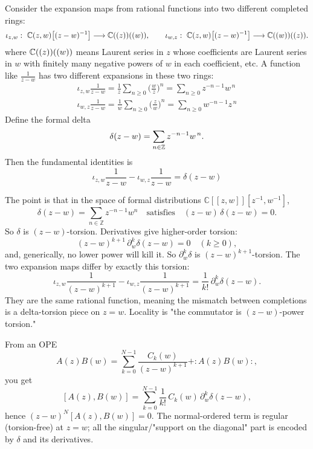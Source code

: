 \documentclass[12pt]{article}
\begin{document}
\begin{remark}
     Consider the expansion maps from rational functions into two different completed rings:
\[
\iota_{z,w}:\ \C(z,w)\!\left[(z-w)^{-1}\right]\longrightarrow \C((z))((w)),
\qquad
\iota_{w,z}:\ \C(z,w)\!\left[(z-w)^{-1}\right]\longrightarrow \C((w))((z)).
\] where \( \mathbb{C}((z))((w)) \) means Laurent series in $z$ whose coefficients are Laurent series in $w$ with finitely many negative powers of $w$ in each coefficient, etc. A function like \( \frac{1}{z-w} \) has two different expansions in these two rings: \begin{align*}
\iota_{z,w}\frac{1}{z-w}
= \frac{1}{z}\sum_{n\ge0}\Big(\frac{w}{z}\Big)^n
= \sum_{n\ge0} z^{-n-1} w^{\,n} \\
\iota_{w,z}\frac{1}{z-w}
= \frac{1}{w}\sum_{n\ge0}\Big(\frac{z}{w}\Big)^n
= \sum_{n\ge0} w^{-n-1} z^{\,n}
\end{align*}
Define the formal delta
\[
\delta(z-w)=\sum_{n\in\mathbb{Z}} z^{-n-1}w^{\,n}.
\]
Then the fundamental identities is
\[
\iota_{z,w}\frac{1}{z-w}-\iota_{w,z}\frac{1}{z-w}= \delta(z-w)
\]
\end{remark}
The point is that in the space of formal distributions $\mathbb{C}[[z,w]][z^{-1},w^{-1}]$,
\[
\delta(z-w)=\sum_{n\in\mathbb{Z}} z^{-n-1}w^n
\quad\text{satisfies}\quad
(z-w)\,\delta(z-w)=0.
\]
So $\delta$ is $(z-w)$-torsion. Derivatives give higher-order torsion:
\[
(z-w)^{k+1}\,\partial_w^k\delta(z-w)=0\quad(k\ge0),
\]
and, generically, no lower power will kill it. So $\partial_w^k\delta$ is $(z-w)^{k+1}$-torsion. The two expansion maps differ by exactly this torsion:
\[
\iota_{z,w}\frac{1}{(z-w)^{k+1}}-\iota_{w,z}\frac{1}{(z-w)^{k+1}}
=\frac{1}{k!}\,\partial_w^k\delta(z-w).
\]
They are the same rational function, meaning the mismatch between completions is a delta-torsion piece on $z=w$. Locality is "the commutator is $(z-w)$-power torsion."

From an OPE
\[
A(z)B(w)=\sum_{k=0}^{N-1}\frac{C_k(w)}{(z-w)^{k+1}}+ :A(z)B(w):,
\]
you get
\[
[A(z),B(w)]=\sum_{k=0}^{N-1}\frac{1}{k!}\,C_k(w)\,\partial_w^k\delta(z-w),
\]
hence $(z-w)^N[A(z),B(w)]=0$. The normal-ordered term is regular (torsion-free) at $z=w$; all the singular/"support on the diagonal" part is encoded by $\delta$ and its derivatives.
\end{document}
